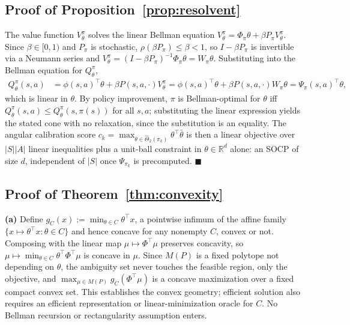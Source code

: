 \documentclass{article}
\begin{document}
\subsection{Proof of Proposition~\ref{prop:resolvent}}
\label{app:proof-resolvent}

The value function $V^\pi_\theta$ solves the linear Bellman equation
$V^\pi_\theta = \Phi_\pi\theta + \beta P_\pi V^\pi_\theta$. Since
$\beta\in[0,1)$ and $P_\pi$ is stochastic, $\rho(\beta P_\pi)\le\beta<1$, so
$I-\beta P_\pi$ is invertible via a Neumann series and
$V^\pi_\theta = (I-\beta P_\pi)^{-1}\Phi_\pi\theta = W_\pi\theta$. Substituting
into the Bellman equation for $Q^\pi_\theta$,
\begin{align*}
Q^\pi_\theta(s,a) &= \phi(s,a)^\top\theta + \beta P(s,a,\cdot) V^\pi_\theta
= \phi(s,a)^\top\theta + \beta P(s,a,\cdot) W_\pi\theta
= \Psi_\pi(s,a)^\top\theta,
\end{align*}
which is linear in $\theta$. By policy improvement, $\pi$ is Bellman-optimal
for $\theta$ iff $Q^\pi_\theta(s,a)\le Q^\pi_\theta(s,\pi(s))$ for all $s,a$;
substituting the linear expression yields the stated cone with no relaxation,
since the substitution is an equality. The angular calibration score
$c_k=\max_{\theta\in\hat\Theta_2(\pi_k)}\theta^\top\bar\theta$ is then a linear
objective over $|S||A|$ linear inequalities plus a unit-ball constraint in
$\theta\in\mathbb R^d$ alone: an SOCP of size $d$, independent of $|S|$ once
$\Psi_{\pi_k}$ is precomputed. $\blacksquare$

\subsection{Proof of Theorem~\ref{thm:convexity}}
\label{app:proof-convexity}

\textbf{(a)} Define $g_C(x) := \min_{\theta\in C}\theta^\top x$, a pointwise
infimum of the affine family $\{x\mapsto\theta^\top x : \theta\in C\}$ and
hence concave for any nonempty $C$, convex or not. Composing with the linear
map $\mu\mapsto\Phi^\top\mu$ preserves concavity, so
$\mu \mapsto \min_{\theta\in C}\theta^\top\Phi^\top\mu$ is concave in $\mu$.
Since $M(P)$ is a fixed polytope not depending on $\theta$, the ambiguity set
never touches the feasible region, only the objective, and
$\max_{\mu\in M(P)} g_C(\Phi^\top\mu)$ is a concave maximization over a fixed
compact convex set. This establishes the convex geometry; efficient solution
also requires an efficient representation or linear-minimization oracle for
$C$. No Bellman recursion or rectangularity assumption enters.
\end{document}
